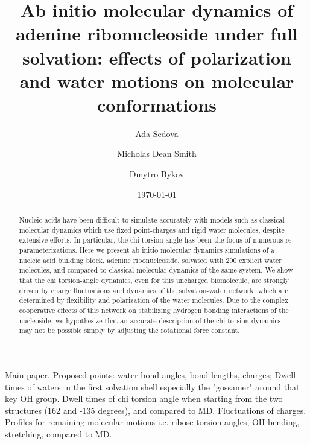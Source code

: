 \documentclass[11pt]{article}
\begin{document}
 \title{\Large \textbf{{ Ab initio molecular dynamics of adenine ribonucleoside under full solvation: effects of polarization and water motions on molecular conformations}}}
\author[1]{Ada Sedova}
\author[2]{Micholas Dean Smith}
\author[1]{Dmytro Bykov}
\date{\today}
\maketitle
\begin{abstract}
Nucleic acids have been difficult to simulate accurately with models such as classical molecular dynamics which use fixed point-charges and rigid water molecules, despite extensive efforts. In particular, the chi torsion angle has been the focus of numerous re-parameterizations. Here we present ab initio molecular dynamics simulations of a nucleic acid building block, adenine ribonucleoside, solvated with 200 explicit water molecules, and compared to classical molecular dynamics of the same system. We show that the chi torsion-angle dynamics, even for this uncharged biomolecule, are strongly driven by charge fluctuations and dynamics of the solvation-water network, which are determined by flexibility and polarization of the water molecules. Due to the complex cooperative effects of this network on stabilizing hydrogen bonding interactions of the nucleoside, we hypothesize that an accurate description of the chi torsion dynamics may not be possible simply by adjusting the rotational force constant.

\end{abstract}
Main paper. Proposed points: water bond angles, bond lengths, charges; Dwell times of waters in the first solvation shell especially the "gossamer" around that key OH group. Dwell times of chi torsion angle when starting from the two structures (162 and -135 degrees), and compared to MD. Fluctuations of charges. Profiles for remaining molecular motions i.e. ribose torsion angles, OH bending, stretching, compared to MD.
\end{document}
